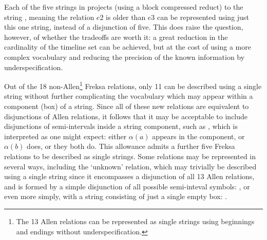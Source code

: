 \documentclass[a4paper,12pt,leqno]{article}
\newcommand{\vph}[1]{\vphantom{#1}}
\newcommand{\ebox}[1]{\fbox{$\vph{'(),}#1$}}
\newcommand{\EventString}[1]{%
	\renewcommand*{\do}[1]{\ebox{##1}}%
	\PipeParser{#1}%
}
\begin{document}
Each of the five strings in  projects (using a block compressed reduct) to the string \EventString{\alpha(e2),\alpha(e3)|\alpha(e3)|{}}, meaning the relation $e2$ is older than $e3$ can be represented using just this one string, instead of a disjunction of five. This does raise the question, however, of whether the tradeoffs are worth it: a great reduction in the cardinality of the timeline set can be achieved, but at the cost of using a more complex vocabulary and reducing the precision of the known information by underspecification.

Out of the 18 non-Allen\footnote{The 13 Allen relations can be represented as single strings using beginnings and endings without underspecification.} Freksa relations, only 11 can be described using a single string without further complicating the vocabulary which may appear within a component (box) of a string. Since all of these new relations are equivalent to disjunctions of Allen relations, it follows that it may be acceptable to include disjunctions of semi-intervals inside a string component, such as \ebox{\alpha(a) \lor \alpha(b)}, which is interpreted as one might expect: either $\alpha(a)$ appears in the component, or $\alpha(b)$ does, or they both do. This allowance admits a further five Freksa relations to be described as single strings. Some relations may be represented in several ways, including the `unknown' relation, which may trivially be described using a single string since it encompasses a disjunction of all 13 Allen relations, and is formed by a simple disjunction of all possible semi-inteval symbols: \ebox{\alpha(a) \lor \alpha(b) \lor \omega(a) \lor \omega(b) \lor \epsilon}, or even more simply, with a string consisting of just a single empty box: \ebox{}.
\end{document}
